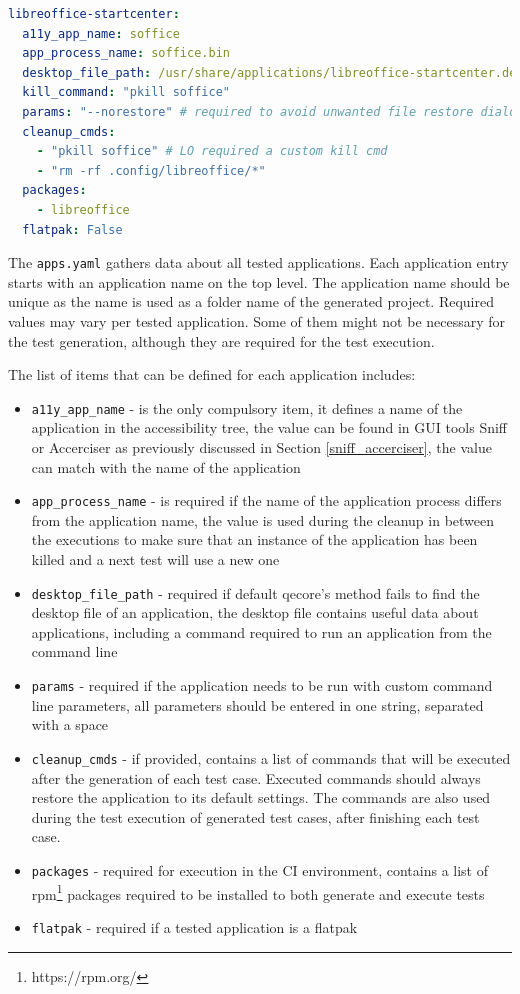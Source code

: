 \begin{lstlisting}[language=yaml,caption={Example of the apps.yaml entry for LibreOffice Start Center},label={apps.yaml}]
libreoffice-startcenter:
  a11y_app_name: soffice
  app_process_name: soffice.bin
  desktop_file_path: /usr/share/applications/libreoffice-startcenter.desktop
  kill_command: "pkill soffice"
  params: "--norestore" # required to avoid unwanted file restore dialogs
  cleanup_cmds:
    - "pkill soffice" # LO required a custom kill cmd
    - "rm -rf .config/libreoffice/*"
  packages:
    - libreoffice
  flatpak: False
\end{lstlisting}

The \texttt{apps.yaml} gathers data about all tested applications. Each application entry starts with an application name on the top level. The application name should be unique as the name is used as a folder name of the generated project. Required values may vary per tested application. Some of them might not be necessary for the test generation, although they are required for the test execution.

The list of items that can be defined for each application includes:

\begin{itemize}
    \item \texttt{a11y\_app\_name} - is the only compulsory item, it defines a name of the application in the accessibility tree, the value can be found in GUI tools Sniff or Accerciser as previously discussed in Section \ref{sniff_accerciser}, the value can match with the name of the application
     \item \texttt{app\_process\_name} - is required if the name of the application process differs from the application name, the value is used during the cleanup in between the executions to make sure that an instance of the application has been killed and a next test will use a new one
     \item \texttt{desktop\_file\_path} - required if default qecore's method fails to find the desktop file of an application, the desktop file contains useful data about applications, including a command required to run an application from the command line
     \item \texttt{params} - required if the application needs to be run with custom command line parameters, all parameters should be entered in one string, separated with a space
     \item \texttt{cleanup\_cmds} - if provided, contains a list of commands that will be executed after the generation of each test case. Executed commands should always restore the application to its default settings. The commands are also used during the test execution of generated test cases, after finishing each test case. 
     \item \texttt{packages} - required for execution in the CI environment, contains a list of rpm\footnote{https://rpm.org/} packages required to be installed to both generate and execute tests
     \item \texttt{flatpak} - required if a tested application is a flatpak
\end{itemize}

